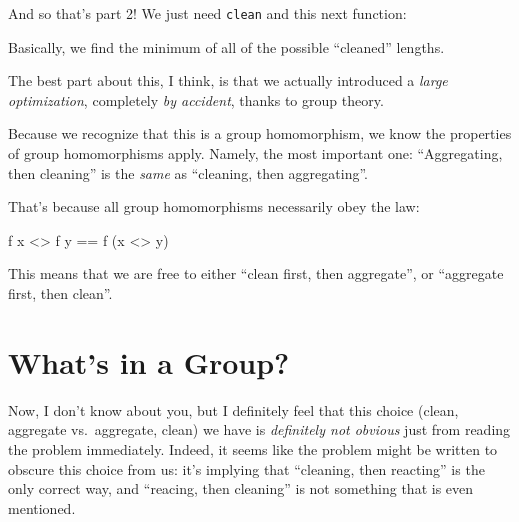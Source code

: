 \documentclass[]{article}
\newenvironment{Shaded}{}{}
\newcommand{\CharTok}[1]{\textcolor[rgb]{0.25,0.44,0.63}{#1}}
\newcommand{\DataTypeTok}[1]{\textcolor[rgb]{0.56,0.13,0.00}{#1}}
\newcommand{\FunctionTok}[1]{\textcolor[rgb]{0.02,0.16,0.49}{#1}}
\newcommand{\KeywordTok}[1]{\textcolor[rgb]{0.00,0.44,0.13}{\textbf{#1}}}
\newcommand{\NormalTok}[1]{#1}
\newcommand{\OtherTok}[1]{\textcolor[rgb]{0.00,0.44,0.13}{#1}}
\begin{document}
And so that's part 2! We just need \texttt{clean} and this next function:

\begin{Shaded}
\end{Shaded}

Basically, we find the minimum of all of the possible ``cleaned'' lengths.

The best part about this, I think, is that we actually introduced a \emph{large
optimization}, completely \emph{by accident}, thanks to group theory.

Because we recognize that this is a group homomorphism, we know the properties
of group homomorphisms apply. Namely, the most important one: ``Aggregating,
then cleaning'' is the \emph{same} as ``cleaning, then aggregating''.

That's because all group homomorphisms necessarily obey the law:

\begin{Shaded}
\begin{Highlighting}[]
\NormalTok{f x }\FunctionTok{<>}\NormalTok{ f y }\FunctionTok{==}\NormalTok{ f (x }\FunctionTok{<>}\NormalTok{ y)}
\end{Highlighting}
\end{Shaded}

This means that we are free to either ``clean first, then aggregate'', or
``aggregate first, then clean''.

\hypertarget{whats-in-a-group}{%
\section{What's in a Group?}\label{whats-in-a-group}}

Now, I don't know about you, but I definitely feel that this choice (clean,
aggregate vs.~aggregate, clean) we have is \emph{definitely not obvious} just
from reading the problem immediately. Indeed, it seems like the problem might be
written to obscure this choice from us: it's implying that ``cleaning, then
reacting'' is the only correct way, and ``reacing, then cleaning'' is not
something that is even mentioned.
\end{document}
